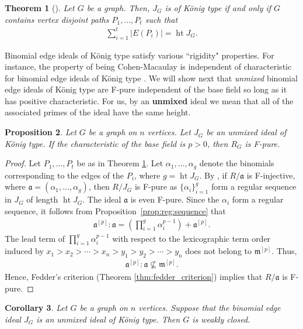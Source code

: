 \documentclass[12pt,a4paper]{amsart}
\theoremstyle{plain}
\newtheorem{thrm}{Theorem}[section]
\def\bthm{\begin{thrm}}
\def\ethm{\end{thrm}}
\newtheorem{prop}[thrm]{Proposition}
\def\bprop{\begin{prop}}
\def\eprop{\end{prop}}
\newtheorem{cor}[thrm]{Corollary}
\def\bcor{\begin{cor}}
\def\ecor{\end{cor}}
\theoremstyle{definition}
\def\bproof{\begin{proof}}
\def\eproof{\end{proof}}
\theoremstyle{remark}
\def\a{\mathfrak{a}}
\def\m{\mathfrak{m}}
\DeclareMathOperator{\hgt}{ht}
\newcommand{\card}[1]{\left \lvert #1 \right\rvert}
\renewcommand{\subset}{\subseteq}
\begin{document}
\bthm[{\cite[Theorem 3.5]{herzog2022graded}}]
\label{thm:bei_konig_type}
Let $G$ be a graph. Then, $J_{G}$ is of K\"onig type if and only if $G$ contains vertex disjoint paths $P_{1}, \ldots, P_{t}$ such that 
\begin{align*}
    \sum_{i=1}^{t} \card{E(P_{i})} = \hgt J_{G}.
\end{align*}
\ethm 

Binomial edge ideals of K\"onig type satisfy various ``rigidity" properties. For instance, the property of being Cohen-Macaulay is independent of characteristic for binomial edge ideals of K\"onig type {\cite[Corollary 3.8]{herzog2022graded}}. We will show next that \textit{unmixed} binomial edge ideals of K\"onig type are F-pure independent of the base field so long as it has positive characteristic. For us, by an \textbf{unmixed} ideal we mean that all of the associated primes of the ideal have the same height.

\bprop 
\label{prop:konig_unmixed_bei_F_pure}
Let $G$ be a graph on $n$ vertices. Let $J_{G}$ be an unmixed ideal of K\"onig type. If the characteristic of the base field is $p >0$, then $R_{G}$ is F-pure.
\eprop 

\bproof
Let $P_{1},\ldots,P_{t}$ be as in Theorem \ref{thm:bei_konig_type}. Let $\alpha_{1},\ldots,\alpha_{g}$ denote the binomials corresponding to the edges of the $P_{i}$, where $g = \hgt J_{G}$. By {\cite[Corollary 3.3]{pandey2024linkage}}, if $R/\a$ is F-injective, where $\a = (\alpha_{1},\ldots,\alpha_{g})$, then $R/J_{G}$ is F-pure as $\{\alpha_{i}\}_{i=1}^{g}$ form a regular sequence in $J_G$ of length $\hgt J_{G}$. The ideal $\a$ is even F-pure. Since the $\alpha_{i}$ form a regular sequence, it follows from Proposition~\ref{prop:reg:sequence} that
\begin{align*}
    \a^{[p]} : \a = \left( \prod_{i=1}^{g} \alpha_{i}^{p-1} \right) + \a^{[p]}.
\end{align*}
The lead term of $\prod_{i=1}^{g} \alpha_{i}^{p-1}$ with respect to the lexicographic term order induced by $x_{1} > x_{2} > \cdots > x_{n} > y_{1} > y_{2} > \cdots > y_{n}$ does not belong to $\m^{[p]}$. Thus, 
\begin{align*}
    \a^{[p]}:\a \not \subset \m^{[p]}.
\end{align*}
Hence, Fedder's criterion (Theorem \ref{thm:fedder_criterion}) implies that $R/\a$ is F-pure.
\eproof 

\bcor 
\label{cor:unmixed_Konig_type_are_wc}
Let $G$ be a graph on $n$ vertices. Suppose that the binomial edge ideal $J_{G}$ is an unmixed ideal of K\"onig type. Then $G$ is weakly closed.
\ecor 
\end{document}
